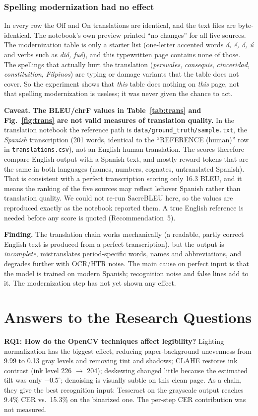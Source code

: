 \documentclass[10pt,twocolumn]{article}
\newcommand{\callout}[2]{%
  \par\medskip\noindent\colorbox{#1}{\parbox{\dimexpr\columnwidth-2\fboxsep}{\small #2}}\par\medskip}
\newcommand{\finding}[1]{\callout{softbox}{\textbf{Finding.} #1}}
\newcommand{\caveat}[1]{\callout{warnbox}{\textbf{Caveat.} #1}}
\begin{document}
\subsubsection{Spelling modernization had no effect}
In every row the Off and On translations are identical, and the text files are byte-identical. The notebook's own preview printed ``no changes'' for all five sources. The modernization table is only a starter list (one-letter accented words \emph{\'a, \'e, \'o, \'u} and verbs such as \emph{di\'o, fu\'e}), and this typewritten page contains none of those. The spellings that actually hurt the translation (\emph{persuales}, \emph{consequis}, \emph{cinceridad}, \emph{constituition}, \emph{Filpinos}) are typing or damage variants that the table does not cover. So the experiment shows that \emph{this} table does nothing on \emph{this} page, not that spelling modernization is useless; it was never given the chance to act.

\caveat{\textbf{The BLEU/chrF values in Table~\ref{tab:trans} and Fig.~\ref{fig:trans} are not valid measures of translation quality.} In the translation notebook the reference path is \texttt{data/ground\_\allowbreak{}truth/sample.txt}, the \emph{Spanish} transcription (201 words, identical to the ``REFERENCE (human)'' row in \texttt{translations.csv}), not an English human translation. The scores therefore compare English output with a Spanish text, and mostly reward tokens that are the same in both languages (names, numbers, cognates, untranslated Spanish). That is consistent with a perfect transcription scoring only 16.3 BLEU, and it means the ranking of the five sources may reflect leftover Spanish rather than translation quality. We could not re-run SacreBLEU here, so the values are reproduced exactly as the notebook reported them. A true English reference is needed before any score is quoted (Recommendation~5).}

\finding{The translation chain works mechanically (a readable, partly correct English text is produced from a perfect transcription), but the output is \emph{incomplete}, mistranslates period-specific words, names and abbreviations, and degrades further with OCR/HTR noise. The main cause on perfect input is that the model is trained on modern Spanish; recognition noise and false lines add to it. The modernization step has not yet shown any effect.}

\section{Answers to the Research Questions}\label{sec:rq}
\textbf{RQ1: How do the OpenCV techniques affect legibility?} Lighting normalization has the biggest effect, reducing paper-background unevenness from 9.99 to 0.13 gray levels and removing tint and shadows; CLAHE restores ink contrast (ink level 226 $\rightarrow$ 204); deskewing changed little because the estimated tilt was only $-0.5^\circ$; denoising is visually subtle on this clean page. As a chain, they give the best recognition input: Tesseract on the grayscale output reaches 9.4\% CER vs.\ 15.3\% on the binarized one. The per-step CER contribution was not measured.
\end{document}
